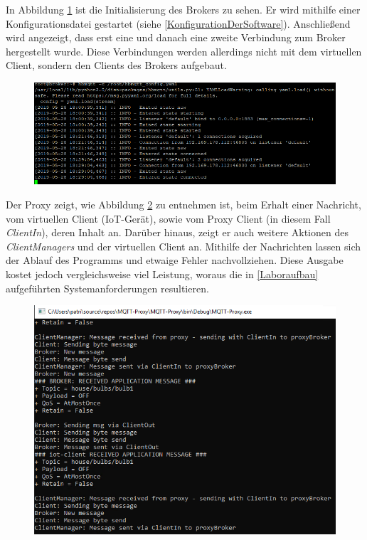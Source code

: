 In Abbildung \ref{fig:broker_connections} ist die Initialisierung des Brokers zu sehen. Er wird mithilfe einer Konfigurationsdatei gestartet (siehe \ref{KonfigurationDerSoftware}). Anschließend wird angezeigt, dass erst eine und danach eine zweite Verbindung zum Broker hergestellt wurde. Diese Verbindungen werden allerdings nicht mit dem virtuellen Client, sondern den Clients des Brokers aufgebaut.
\begin{figure}[!h]%
    \centering
    \includegraphics[width=14cm]{tex/bilder/6_validierung/BrokerConnections.png}
    \label{fig:broker_connections}
\end{figure}

Der Proxy zeigt, wie Abbildung \ref{fig:proxy_messages} zu entnehmen ist, beim Erhalt einer Nachricht, vom virtuellen Client (\ac{IoT}-Gerät), sowie vom Proxy Client (in diesem Fall \emph{ClientIn}), deren Inhalt an.
Darüber hinaus, zeigt er auch weitere Aktionen des \emph{ClientManagers} und der virtuellen Client an.
Mithilfe der Nachrichten lassen sich der Ablauf des Programms und etwaige Fehler nachvollziehen. Diese Ausgabe kostet jedoch vergleichsweise viel Leistung, woraus die in \ref{Laboraufbau} aufgeführten Systemanforderungen resultieren. 
\begin{figure}[!h]%
    \centering
    \includegraphics[width=12cm]{tex/bilder/6_validierung/ProxyMessages.png}
    \label{fig:proxy_messages}
\end{figure}

